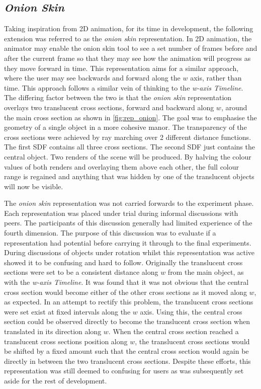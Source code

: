 \documentclass{l4proj}
\begin{document}
\subsection{\textit{Onion Skin}}
Taking inspiration from 2D animation, for its time in development, the following extension was referred to as the \textit{onion skin} representation. In 2D animation, the animator may enable the onion skin tool to see a set number of frames before and after the current frame so that they may see how the animation will progress as they move forward in time. 
This representation aims for a similar approach, where the user may see backwards and forward along the \(w\) axis, rather than time. This approach follows a similar vein of thinking to the \textit{w-axis Timeline}. 
The differing factor between the two is that the \textit{onion skin} representation overlays two translucent cross sections, forward and backward along \(w\), around the main cross section as shown in 
\cref{fig:rep_onion}. The goal was to emphasise the geometry of a single object in a more cohesive manor.
The transparency of the cross sections were achieved by ray marching over 2 different distance functions. The first SDF contains all three cross sections. The second SDF just contains the central object. Two renders of the scene will be produced. By halving the colour values of both renders and overlaying them above each other, the full colour range is regained and anything that was hidden by one of the translucent objects will now be visible.

The \textit{onion skin} representation was not carried forwards to the experiment phase. Each representation was placed under trial during informal discussions with peers. The participants of this discussion generally had limited experience of the fourth dimension. The purpose of this discussion was to evaluate if a representation had potential before carrying it through to the final experiments. 
During discussions of objects under rotation whilst this representation was active showed it to be confusing and hard to follow. 
Originally the translucent cross sections were set to be a consistent distance along \(w\) from the main object, as with the \textit{w-axis Timeline}. It was found that it was not obvious that the central cross section would become either of the other cross sections as it moved along \(w\), as expected. 
In an attempt to rectify this problem, the translucent cross sections were set exist at fixed intervals along the \(w\) axis. Using this, the central cross section could be observed directly to become the translucent cross section when translated in its direction along \(w\). When the central cross section reached a translucent cross sections position along \(w\), the translucent cross sections would be shifted by a fixed amount such that the central cross section would again be directly in between the two translucent cross sections.
Despite these efforts, this representation was still deemed to confusing for users as was subsequently set aside for the rest of development.
\end{document}
